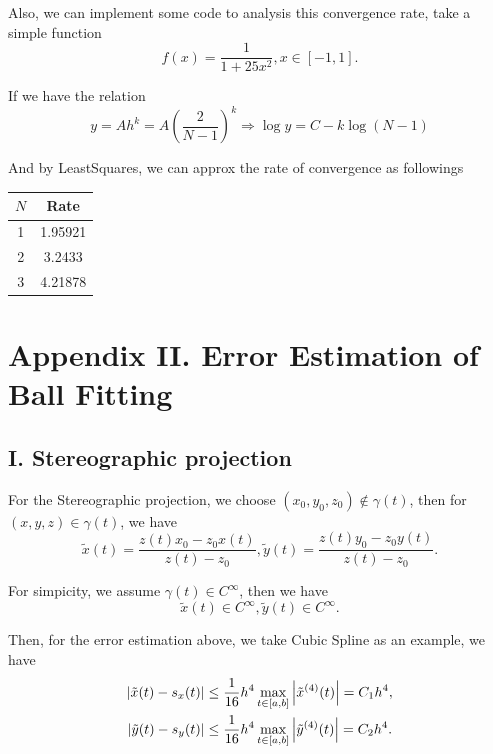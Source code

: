 \documentclass[a4paper]{article}
\begin{document}
Also, we can implement some code to analysis this convergence rate, take a simple function 
\begin{equation}
    f(x) = \frac{1}{1 + 25 x^2}, x\in [-1, 1].
\end{equation}

If we have the relation 
\begin{equation}
    y = A h^k = A (\frac{2}{N-1})^k \Rightarrow \log y = C - k \log (N-1)
\end{equation}

And by LeastSquares, we can approx the rate of convergence as followings 
\begin{table}[H]
    \centering
    \begin{tabular}{|c|c|}
        \hline
        $N$ & Rate \\
        \hline
        1 & 1.95921 \\
        2 & 3.2433 \\
        3 & 4.21878 \\
        \hline
    \end{tabular}
\end{table}


\section{Appendix II. Error Estimation of Ball Fitting}

\subsection{I. Stereographic projection}

For the Stereographic projection, we choose $(x_0, y_0, z_0) \notin \gamma (t)$, then for $(x,y,z) \in \gamma (t)$, we have
\begin{equation}
    \tilde{x}(t) = \frac{z(t) x_0 - z_0 x(t)}{z(t)-z_0}, \tilde{y}(t) = \frac{z(t) y_0 - z_0 y(t)}{z(t)-z_0}.
\end{equation}

For simpicity, we assume $\gamma (t) \in C^{\infty}$, then we have
\begin{equation}
    \tilde{x}(t) \in C^{\infty}, \tilde{y}(t) \in C^{\infty}.
\end{equation}

Then, for the error estimation above, we take Cubic Spline as an example, we have 
\begin{equation}
    \begin{aligned}
        \abs{\tilde{x}(t) - s_x(t)} &\leq \frac{1}{16} h^4 \max_{t \in [a,b]} \abs{\tilde{x}^{(4)}(t)} = C_1 h^4, \\
        \abs{\tilde{y}(t) - s_y(t)} &\leq \frac{1}{16} h^4 \max_{t \in [a,b]} \abs{\tilde{y}^{(4)}(t)} = C_2 h^4.
    \end{aligned}
\end{equation}
\end{document}

